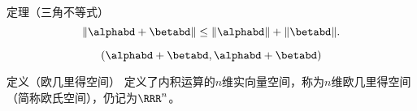 \begin{frame}
  \begin{footnotesize}
    \begin{block}{定理（三角不等式）}
      $$
      \|\alphabd+\betabd\|\le\|\alphabd\|+\|\betabd\|.
      $$
    \end{block}
    \pause\proofname
    $$
    (\alphabd+\betabd,\alphabd+\betabd)
    $$
  \end{footnotesize}
\end{frame}


\begin{frame}
  \begin{footnotesize}
    \begin{block}{定义（欧几里得空间）}
      定义了内积运算的$n$维实向量空间，称为$n$维欧几里得空间（简称欧氏空间），仍记为$\RRR^n$。
    \end{block}
  \end{footnotesize}
\end{frame}

\begin{frame}
  \begin{footnotesize}
    
  \end{footnotesize}
\end{frame}


\begin{frame}
  \begin{footnotesize}
    
  \end{footnotesize}
\end{frame}


\begin{frame}
  \begin{footnotesize}
    
  \end{footnotesize}
\end{frame}


\begin{frame}
  \begin{footnotesize}
    
  \end{footnotesize}
\end{frame}
